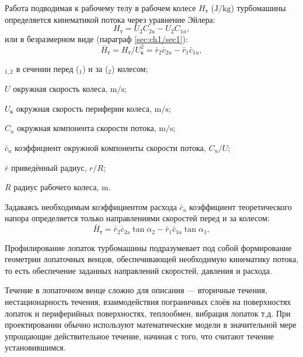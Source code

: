 Работа подводимая к рабочему телу в рабочем колесе \(H_\text{т}\) (\(\si\joule/\si\kilogram\)) турбомашины определяется кинематикой потока через уравнение Эйлера:
\begin{equation}
	H_\text{т} = U_2 C_{2u} - U_2 C_{1u},
	\label{eq:Ht}
\end{equation}
или в безразмерном виде (параграф \ref{sec:ch1/sec1}):
\begin{equation}
	\bar{H}_\text{т} = H_\text{т}/U_\text{к}^2 = \bar{r}_2 \bar{c}_{2u} - \bar{r}_1 \bar{c}_{1u},
	\label{eq:H_t}
\end{equation}
\begin{eqexpl}
	\item{\(_{1,2}\)} в сечении перед (\(_1\)) и за (\(_2\)) колесом;
	\item{\(U\)} окружная скорость колеса, \(\si\meter/\si\second\);
	\item{\(U_\text{к}\)} окружная скорость периферии колеса, \(\si\meter/\si\second\);
	\item{\(C_{u}\)} окружная компонента скорости потока, \(\si\meter/\si\second\);
	\item{\(\bar{c}_{u}\)} коэффициент окружной компоненты скорости потока, \(C_{u}/U\);
	\item{\(\bar{r}\)} приведённый радиус, \(r/R\);
	\item{\(R\)} радиус рабочего колеса, \(\si\meter\).
\end{eqexpl}
Задаваясь необходимым коэффициентом расхода \(\bar{c}_\text{a}\) коэффициент теоретического напора определяется только направлениями скоростей перед и за колесом:
\begin{equation}
	\bar{H}_\text{т} = \bar{r}_2 \bar{c}_\text{2a} \tan\alpha_2 - \bar{r}_1 \bar{c}_{1a} \tan\alpha_1,
	\label{eq:H_t_tan}
\end{equation}

Профилирование лопаток турбомашины подразумевает под собой формирование геометрии лопаточных венцов, обеспечивающей необходимую кинематику потока, то есть обеспечение заданных направлений скоростей, давления и расхода. 

Течение в лопаточном венце сложно для описания –-- вторичные течения, нестационарность течения, взаимодействия пограничных слоёв на поверхностях лопаток и периферийных поверхностях, теплообмен, вибрация лопаток т.д. При проектировании обычно используют математические модели в значительной мере упрощающие действительное течение, начиная с того, что  считают течение установившимся.

